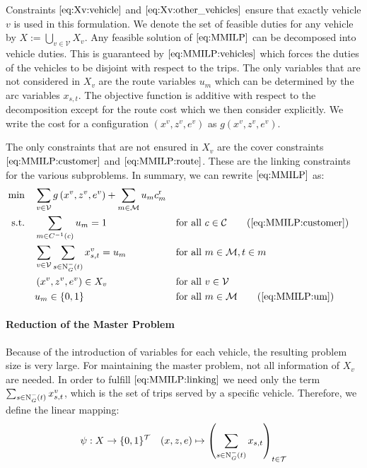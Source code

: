 Constraints $\eqref{eq:Xv:vehicle}$ and $\eqref{eq:Xv:other_vehicles}$ ensure that exactly vehicle $v$ is used in this formulation. We denote the set of feasible duties for any vehicle by $X:=\bigcup_{v\in\mathcal{V}}X_v$. Any feasible solution of $\eqref{eq:MMILP}$ can be decomposed into vehicle duties. This is guaranteed by $\eqref{eq:MMILP:vehicles}$ which forces the duties of the vehicles to be disjoint with respect to the trips. The only variables that are not considered in $X_v$ are the route variables $u_m$ which can be determined by the arc variables $x_{s,t}$. The objective function is additive with respect to the decomposition except for the route cost which we then consider explicitly. We write the cost for a configuration $\left(x^v,z^v,e^v\right)$ as $g\left(x^v,z^v,e^v\right)$.

The only constraints that are not ensured in $X_v$ are the cover constraints $\eqref{eq:MMILP:customer}$ and $\eqref{eq:MMILP:route}$. These are the linking constraints for the various subproblems. In summary, we can rewrite $\eqref{eq:MMILP}$ as:
\begin{align}
	\min \quad & \sum_{v\in\mathcal{V}}g\left(x^v,z^v,e^v\right) + \sum_{m\in\mathcal{M}} u_m \croute_m \nonumber \\
	\text{s.t.} \quad & \sum_{m\in C^{-1}(c)} u_m = 1 && \text{for all } c\in\mathcal{C} \tag{\ref{eq:MMILP:customer}} \\
	& \sum_{v\in\mathcal{V}}\sum_{s\in\Nin(t)}x^v_{s,t} = u_m && \text{for all } m\in\mathcal{M},t\in m \label{eq:MMILP:linking} \\
	& \left(x^v,z^v,e^v\right)\in X_v && \text{for all } v\in\mathcal{V} \nonumber \\
	& u_m\in\{0,1\} && \text{for all } m\in\mathcal{M} \tag{\ref{eq:MMILP:um}}
\end{align}

\paragraph{Reduction of the Master Problem} \parfill

Because of the introduction of variables for each vehicle, the resulting problem size is very large. For maintaining the master problem, not all information of $X_v$ are needed. In order to fulfill $\eqref{eq:MMILP:linking}$ we need only the term ${\sum_{s\in\operatorname{N}_G^-(t)} x^v_{s,t}}$, which is the set of trips served by a specific vehicle. Therefore, we define the linear mapping:
\begin{align*}
	\psi:X\to\{0,1\}^{\mathcal{T}} && (x,z,e)\mapsto\left(\sum_{s\in\operatorname{N}_G^-(t)}x_{s,t}\right)_{t\in\mathcal{T}} \label{eq:psi}
\end{align*}

